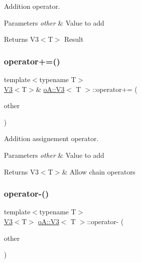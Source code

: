 Addition operator. 


\begin{DoxyParams}{Parameters}
{\em other} & Value to add \\
\hline
\end{DoxyParams}
\begin{DoxyReturn}{Returns}
V3$<$\+T$>$ Result 
\end{DoxyReturn}
\mbox{\label{structo_a_1_1_v3_ac69717bc685dc757a3e11566bdc9da00}} 
\subsubsection{\texorpdfstring{operator+=()}{operator+=()}}
{\footnotesize\ttfamily template$<$typename T$>$ \\
\mbox{\hyperlink{structo_a_1_1_v3}{V3}}$<$T$>$\& \mbox{\hyperlink{structo_a_1_1_v3}{o\+A\+::\+V3}}$<$ T $>$\+::operator+= (\begin{DoxyParamCaption}\item[{const \mbox{\hyperlink{structo_a_1_1_v3}{o\+A\+::\+V3}}$<$ T $>$ \&}]{other }\end{DoxyParamCaption})\hspace{0.3cm}{\ttfamily [inline]}}



Addition assignement operator. 


\begin{DoxyParams}{Parameters}
{\em other} & Value to add \\
\hline
\end{DoxyParams}
\begin{DoxyReturn}{Returns}
V3$<$\+T$>$\& Allow chain operators 
\end{DoxyReturn}
\mbox{\label{structo_a_1_1_v3_a3e6d329582bd5e0b4ca407576b5135e4}} 
\subsubsection{\texorpdfstring{operator-\/()}{operator-()}}
{\footnotesize\ttfamily template$<$typename T$>$ \\
\mbox{\hyperlink{structo_a_1_1_v3}{V3}}$<$T$>$ \mbox{\hyperlink{structo_a_1_1_v3}{o\+A\+::\+V3}}$<$ T $>$\+::operator-\/ (\begin{DoxyParamCaption}\item[{const \mbox{\hyperlink{structo_a_1_1_v3}{o\+A\+::\+V3}}$<$ T $>$ \&}]{other }\end{DoxyParamCaption})\hspace{0.3cm}{\ttfamily [inline]}}



